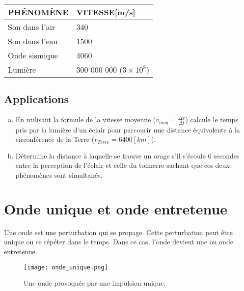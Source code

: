 \begin{center}
    \begin{tabularx}{.8 \textwidth}{m{} X}
        \hline
        \uppercase{Phénomène} & \uppercase{Vitesse}[m/s]        \\
        \hline
        Son dans l'air        & 340                             \\
        \hline
        Son dans l'eau        & 1500                            \\
        \hline
        Onde sismique         & 4060                            \\
        \hline
        Lumière               & 300 000 000 (\(3 \times 10^8\)) \\
        \hline
    \end{tabularx}
\end{center}


\subsection{Applications}
\begin{enumerate}[a)]
    \item En utilisant la formule de la vitesse moyenne (\(v_{moy}=\frac{\Delta x}{\Delta t}\)) calcule le temps pris par la lumière d'un éclair pour parcourir une distance équivalente à la circonférence de la Terre (\(r_{Terre} = 6400 [ km]\)).
    \item Détermine la distance à laquelle se trouve un orage s'il s'écoule 6 secondes entre la perception de l'éclair et celle du tonnerre sachant que ces deux phénomènes sont simultanés.
\end{enumerate}

\newpage

\section{Onde unique et onde entretenue}
\label{Onde unique et onde entretenue}
Une onde est une perturbation qui se propage. Cette perturbation peut être unique ou se répéter dans le temps. Dans ce cas, l'onde devient une  ou onde entretenue.

\begin{figure}[ht!]
    \centering
    \texttt{[image: onde\_unique.png]}
    \caption{Une onde provoquée par une impulsion unique.}
    \label{onde_unique}
\end{figure}

